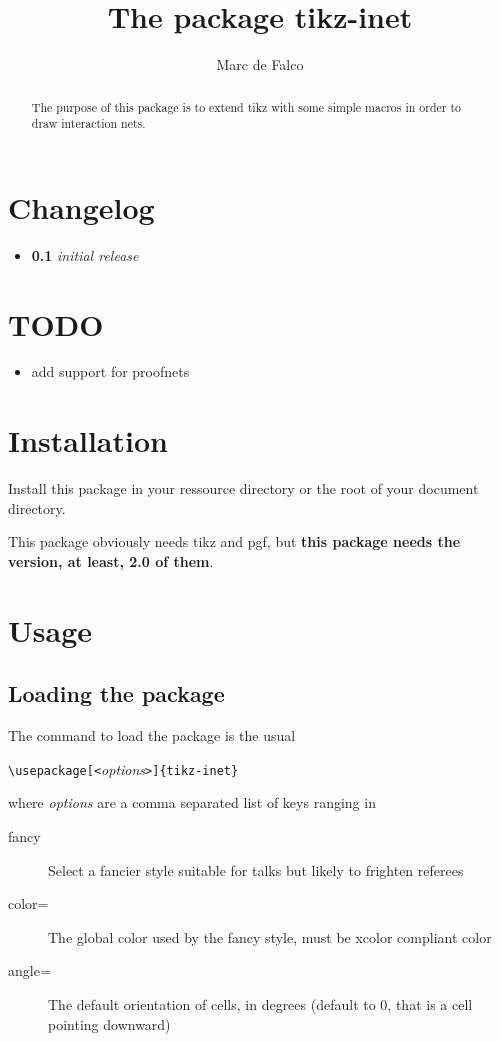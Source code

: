 \documentclass[10pt,a4paper]{article}
\begin{document}
\title{The package \textsf{tikz-inet}}
\author{Marc de Falco}
\maketitle

\begin{abstract}
    The purpose of this package is to extend tikz
    with some simple macros in order to draw interaction
    nets.
\end{abstract}

\section*{Changelog}
\newcommand{\changeitem}[2]{\item \textbf{#1} \textit{#2}}
\begin{itemize}
    \changeitem{0.1}{initial release}
\end{itemize}

\section*{TODO}
\begin{itemize}
    \item add support for proofnets
\end{itemize}

\section{Installation}
Install this package in your ressource directory or the root of your 
document directory.

This package obviously needs tikz and pgf, but \textbf{this package needs
the version, at least, 2.0 of them}.

\section{Usage}
\subsection{Loading the package}
The command to load the package is the usual 

\verb+\usepackage[<+\emph{options}\verb+>]{tikz-inet}+

where \emph{options} are a comma separated list of keys ranging in

\begin{description}
    \item[fancy] Select a fancier style suitable for talks but
        likely to frighten referees
    \item[color=] The global color used by the fancy style, must
        be xcolor compliant color
    \item[angle=] The default orientation of cells, in degrees (default to $0$, that is a cell pointing downward)
\end{description}
\end{document}
